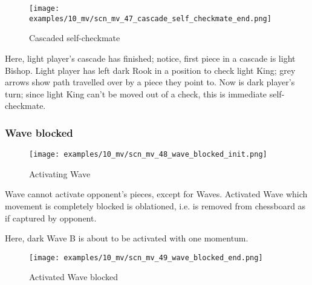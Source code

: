 \vspace*{-2.1\baselineskip}
\noindent
\begin{figure}[h]
\texttt{[image: examples/10\_mv/scn\_mv\_47\_cascade\_self\_checkmate\_end.png]}
\caption{Cascaded self-checkmate}
\label{fig:scn_mv_47_cascade_self_checkmate_end}
\end{figure}

Here, light player's cascade has finished; notice, first piece in a cascade is light
Bishop. Light player has left dark Rook in a position to check light King; grey arrows
show path travelled over by a piece they point to. Now is dark player's turn; since
light King can't be moved out of a check, this is immediate self-checkmate.

\clearpage %

\subsubsection*{Wave blocked}
\label{sec:Miranda's veil/Wave/Cascading opponent/Wave blocked}

\vspace*{-1.4\baselineskip}
\noindent
\begin{figure}[h]
\texttt{[image: examples/10\_mv/scn\_mv\_48\_wave\_blocked\_init.png]}
\caption{Activating Wave}
\label{fig:scn_mv_48_wave_blocked_init}
\end{figure}

Wave cannot activate opponent's pieces, except for Waves. Activated Wave which movement
is completely blocked is oblationed, i.e. is removed from chessboard as if captured by
opponent.

Here, dark Wave B is about to be activated with one momentum.

\clearpage %

\vspace*{-2.1\baselineskip}
\noindent
\begin{figure}[h]
\texttt{[image: examples/10\_mv/scn\_mv\_49\_wave\_blocked\_end.png]}
\caption{Activated Wave blocked}
\label{fig:scn_mv_49_wave_blocked_end}
\end{figure}

